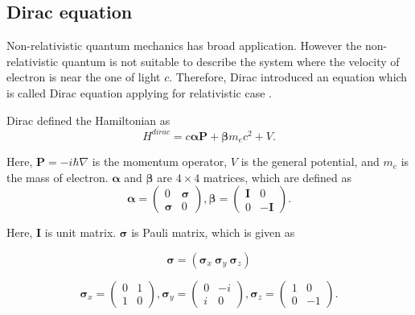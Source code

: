 \documentclass[a4paper, 12pt, titlepage,oneside,drop]{kthesis}
\begin{document}
\subsection{Dirac equation}

Non-relativistic quantum mechanics has broad application. However the non-relativistic quantum is not suitable to describe the system where the velocity of electron is near the one of light $c$. 
Therefore, Dirac introduced an equation which is called Dirac equation applying for relativistic case \cite{thaller1992dirac, dirac1930principles}.

\noindent Dirac defined the Hamiltonian as
\begin{equation}\label{dirac}
{H}^{dirac} = c \boldsymbol{\alpha} \textbf{P} + \boldsymbol{\beta}m_ec^{2} + V.
\end{equation}

\noindent Here, $\textbf{P} = -i\hbar \nabla $ is the momentum operator, $V$ is the general potential, and $m_e$ is the mass of electron. 
 $\boldsymbol{\alpha}$ and $\boldsymbol{\beta}$ are $4 \times 4$ matrices, which are defined as
\begin{equation}
 \boldsymbol{\alpha} = \left( \begin{array}{cc}
 0 & \boldsymbol{\sigma}  \\
 \boldsymbol{\sigma} & 0   \end{array} \right),
\boldsymbol{\beta} = \left( \begin{array}{ccc}
\boldsymbol{I} & 0\\
0 & -\boldsymbol{I}\end{array} \right).
\end{equation}

\noindent Here, $\boldsymbol{I}$ is unit matrix. $\boldsymbol{\sigma}$ is Pauli matrix, which is given as

\begin{equation} 
\boldsymbol{\sigma} = (\boldsymbol{\sigma}_x \  \boldsymbol{\sigma}_y \  \boldsymbol{\sigma}_z )  
\end{equation}

\begin{equation}
\boldsymbol{\sigma}_x = \left( \begin{array}{cc}
0 & 1\\
1 & 0\end{array} \right),
\boldsymbol{\sigma}_y = \left( \begin{array}{ccc}
0 & -i\\
i & 0\end{array} \right),
\boldsymbol{\sigma}_z = \left( \begin{array}{ccc}
1 & 0\\
0 & -1\end{array} \right).
\end{equation}
\end{document}
